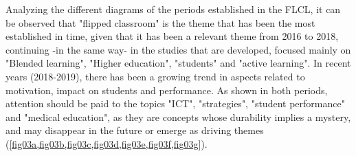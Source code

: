 \documentclass{textolivre-html}
\begin{document}
Analyzing the different diagrams of the periods established in the FLCL, it can be observed that "flipped classroom" is the theme that has been the most established in time, given that it has been a relevant theme from 2016 to 2018, continuing -in the same way- in the studies that are developed, focused mainly on "Blended learning", "Higher education", "students" and "active learning". In recent years (2018-2019), there has been a growing trend in aspects related to motivation, impact on students and performance. As shown in both periods, attention should be paid to the topics "ICT", "strategies", "student performance" and "medical education", as they are concepts whose durability implies a mystery, and may disappear in the future or emerge as driving themes (\cref{fig03a,fig03b,fig03c,fig03d,fig03e,fig03f,fig03g}).
\end{document}
